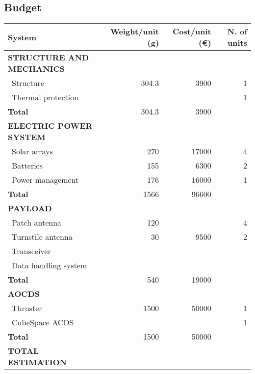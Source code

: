 
\subsection{Budget}

\begin{longtable}{| l | r | r | r |}
\rowcolor[gray]{0.80}	\textbf{System} & \textbf{Weight/unit (g)} & \textbf{Cost/unit (\euro)} & \textbf{N. of units}\\
    \hline
    \endfirsthead


\rowcolor[gray]{0.85} \textbf{STRUCTURE AND MECHANICS} & & & \\

   ~Structure & 304.3 & 3900 & 1 \\
   ~Thermal protection & & & 1\\
   \hline
   \rowcolor[gray]{0.95} \textbf{Total} & 304.3 & 3900 &  \\
   \hline
   
\rowcolor[gray]{0.85} \textbf{ELECTRIC POWER SYSTEM} & & & \\

   ~Solar arrays & 270 & 17000 & 4 \\
   ~Batteries & 155 & 6300 & 2 \\
   ~Power management & 176 & 16000 & 1 \\
   \hline
   \rowcolor[gray]{0.95} \textbf{Total} & 1566 & 96600 &  \\
   \hline

\rowcolor[gray]{0.85} \textbf{PAYLOAD} & & & \\

   ~Patch antenna & 120 & & 4 \\
   ~Turnstile antenna & 30 & 9500 & 2 \\
   ~Transceiver & & & \\
   ~Data handling system & & &\\
   \hline
   \rowcolor[gray]{0.95} \textbf{Total} & 540 & 19000 & \\
   \hline
   
\rowcolor[gray]{0.85} \textbf{AOCDS} & & &\\

   ~Thruster & 1500 & 50000 & 1 \\
   ~CubeSpace ACDS & & & 1 \\
   \hline
   \rowcolor[gray]{0.95} \textbf{Total} & 1500 & 50000 & \\
   \hline
   
\rowcolor[gray]{0.9} \textbf{TOTAL ESTIMATION} & & & \\


\end{longtable} 
